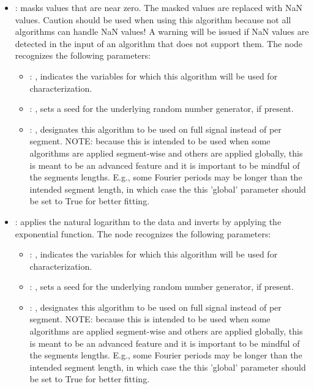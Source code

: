 \begin{itemize}
    \item {}:
      masks values that are near zero. The masked values are replaced with NaN     values. Caution
      should be used when using this algorithm because not all algorithms can handle     NaN values!
      A warning will be issued if NaN values are detected in the input of an algorithm that     does
      not support them.
      The  node recognizes the following parameters:
        \begin{itemize}
          \item {}: , 
            indicates the variables for which this algorithm will be used for characterization.
          \item {}: , 
            sets a seed for the underlying random number generator, if present.
          \item {}: , 
            designates this algorithm to be used on full signal instead of per
            segment. NOTE: because this is intended to be used when some algorithms are
            applied segment-wise and others are applied globally, this is meant to be an
            advanced feature and it is important to be mindful of the segments lengths.
            E.g., some Fourier periods may be longer than the intended segment length, in
            which case the this 'global' parameter should be set to True for better
            fitting. 
      \end{itemize}

    \item {}:
      applies the natural logarithm to the data and inverts by applying the
      exponential function.
      The  node recognizes the following parameters:
        \begin{itemize}
          \item {}: , 
            indicates the variables for which this algorithm will be used for characterization.
          \item {}: , 
            sets a seed for the underlying random number generator, if present.
          \item {}: , 
            designates this algorithm to be used on full signal instead of per
            segment. NOTE: because this is intended to be used when some algorithms are
            applied segment-wise and others are applied globally, this is meant to be an
            advanced feature and it is important to be mindful of the segments lengths.
            E.g., some Fourier periods may be longer than the intended segment length, in
            which case the this 'global' parameter should be set to True for better
            fitting. 
      \end{itemize}


\end{itemize}
